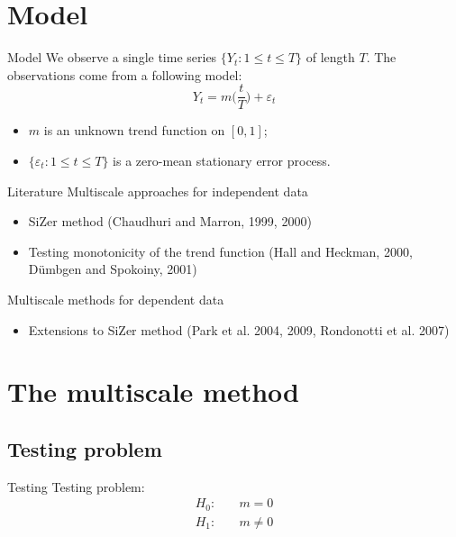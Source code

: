 \documentclass[10pt, handout]{beamer}
\begin{document}
\section{Model}
\begin{frame}{Model}
We observe a single time series $\{Y_t: 1 \le t \le T \}$ of length $T$. The observations come from a following model:
\begin{equation*}\label{model1}
Y_t = m \Big( \frac{t}{T} \Big) + \varepsilon_t 
\end{equation*}\pause
\vspace{-6mm}
\begin{itemize}
\item $m$ is an unknown trend function on $[0,1]$;
\item $\{ \varepsilon_t: 1 \le t \le T \}$ is a zero-mean stationary error process.
\end{itemize}
\end{frame}

\begin{frame}{Literature}
	Multiscale approaches for independent data
	\begin{itemize}
		\item SiZer method (Chaudhuri and Marron, 1999, 2000)
		\item Testing monotonicity of the trend function (Hall and Heckman, 2000, D{\"u}mbgen and Spokoiny, 2001)
	\end{itemize}\pause
	Multiscale methods for dependent data
	\begin{itemize}
		\item Extensions to SiZer method (Park et al. 2004, 2009, Rondonotti et al. 2007)
	\end{itemize}
\end{frame}

\section{The multiscale method}
\subsection{Testing problem}
\begin{frame}{Testing}
Testing problem:
\begin{align*}
H_0:\quad &m = 0\\
H_1:\quad &m\not= 0
\end{align*}
\end{frame}
\end{document}
